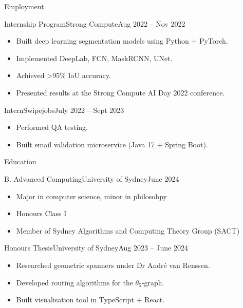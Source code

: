 \documentclass[]{mcdowellcv}
\begin{document}
\begin{cvsection}{Employment}
\begin{cvsubsection}{Internship Program}{Strong Compute}{Aug 2022 -- Nov 2022}
\begin{itemize}
\item Built deep learning segmentation models using Python + PyTorch.
\item Implemented DeepLab, FCN, MaskRCNN, UNet.
\item Achieved >95\% IoU accuracy.
\item Presented results at the Strong Compute AI Day 2022 conference.
\end{itemize}
\end{cvsubsection}

\begin{cvsubsection}{Intern}{Swipejobs}{July 2022 -- Sept 2023}
\begin{itemize}
\item Performed QA testing.
\item Built email validation microservice (Java 17 + Spring Boot).
\end{itemize}
\end{cvsubsection}

\end{cvsection}

\begin{cvsection}{Education}

\begin{cvsubsection}{B. Advanced Computing}{University of Sydney}{June 2024}
\begin{itemize}
\item Major in computer science, minor in philosohpy
\item Honours Class I
\item Member of Sydney Algorithms and Computing Theory Group (SACT)
\end{itemize}
\end{cvsubsection}

\begin{cvsubsection}{Honours Thesis}{University of Sydney}{Aug 2023 -- June 2024}
\begin{itemize}
\item Researched geometric spanners under Dr André van Renssen.
\item Developed routing algorithms for the $\theta_5$-graph.
\item Built visualisation tool in TypeScript + React.
\end{itemize}
\end{cvsubsection}

\end{cvsection}
\end{document}
